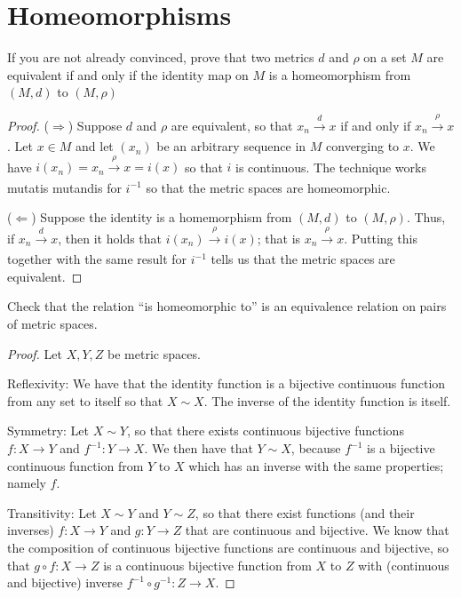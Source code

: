 \section{Homeomorphisms}


\begin{exercise}{43}
If you are not already convinced, prove that two metrics $d$ and $\rho$ on a set $M$ are equivalent if and only if the identity map on $M$ is a homeomorphism from $(M,d)$ to $(M,\rho)$
\end{exercise}
\begin{proof}
($\Rightarrow$)
Suppose $d$ and $\rho$ are equivalent, so that  $x_n\xrightarrow[]{d}x$ if and only if $x_n\xrightarrow[]{\rho}x$.
Let $x\in M$ and let $(x_n)$ be an arbitrary sequence in $M$ converging to $x$.
We have $i(x_n)=x_n\xrightarrow[]{\rho}x=i(x)$ so that $i$ is continuous.
The technique works mutatis mutandis for $i^{-1}$ so that the metric spaces are homeomorphic.

($\Leftarrow$)
Suppose the identity is a homemorphism from $(M,d)$ to $(M,\rho)$.
Thus, if $x_n\xrightarrow[]{d} x$, then it holds that $i(x_n)\xrightarrow[]{\rho} i(x)$; that is $x_n\xrightarrow[]{\rho} x$.
Putting this together with the same result for $i^{-1}$ tells us that the metric spaces are equivalent.
\end{proof} 

\begin{exercise}{44}
Check that the relation ``is homeomorphic to'' is an equivalence relation on pairs of metric spaces.
\end{exercise}
\begin{proof}
Let $X, Y, Z$ be metric spaces.

Reflexivity:
We have that the identity function is a bijective continuous function from any set to itself so that $X\sim X$.
The inverse of the identity function is itself.

Symmetry:
Let $X\sim Y$, so that there exists continuous bijective functions $f:X\to Y$ and $f^{-1}:Y\to X$.
We then have that $Y\sim X$, because $f^{-1}$ is a bijective continuous function from $Y$ to $X$ which has an inverse with the same properties;
namely $f$.

Transitivity:
Let $X\sim Y$ and $Y\sim Z$, so that there exist functions (and their inverses) $f:X\to Y$ and $g:Y\to Z$ that are continuous and bijective.
We know that the composition of continuous bijective functions are continuous and bijective, so that $g\circ f:X\to Z$ is a continuous bijective function from $X$ to $Z$ with (continuous and bijective) inverse $f^{-1}\circ g^{-1}: Z\to X$.
\end{proof} 

